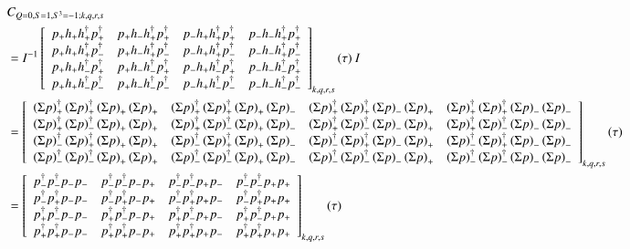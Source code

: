 \begin{equation*}
  \begin{aligned}
    &C_{Q=0,S=1,S^3=-1;k,q,r,s} \\
    &= I^{-1} \left[ 
    {\begin{array}{cccc}
      \cor{+}{+}{+}{+} & \cor{+}{+}{+}{-} & \cor{+}{+}{-}{+} & \cor{+}{+}{-}{-} \\
      \cor{+}{-}{+}{+} & \cor{+}{-}{+}{-} & \cor{+}{-}{-}{+} & \cor{+}{-}{-}{-} \\
      \cor{-}{+}{+}{+} & \cor{-}{+}{+}{-} & \cor{-}{+}{-}{+} & \cor{-}{+}{-}{-} \\
      \cor{-}{-}{+}{+} & \cor{-}{-}{+}{-} & \cor{-}{-}{-}{+} & \cor{-}{-}{-}{-} \\
    \end{array} } \right]_{k,q,r,s} (\tau)\:I \\
    &= \left[
    {\begin{array}{cccc}
      \dscor{+}{+}{+}{+} & \dscor{+}{+}{+}{-} & \dscor{+}{+}{-}{+} & \dscor{+}{+}{-}{-} \\
      \dscor{+}{-}{+}{+} & \dscor{+}{-}{+}{-} & \dscor{+}{-}{-}{+} & \dscor{+}{-}{-}{-} \\
      \dscor{-}{+}{+}{+} & \dscor{-}{+}{+}{-} & \dscor{-}{+}{-}{+} & \dscor{-}{+}{-}{-} \\
      \dscor{-}{-}{+}{+} & \dscor{-}{-}{+}{-} & \dscor{-}{-}{-}{+} & \dscor{-}{-}{-}{-} \\
    \end{array} }
    \right]_{k,q,r,s} (\tau) \\
    &= \left[ 
    {\begin{array}{cccc}
      \dcor{-}{-}{-}{-} & \dcor{-}{-}{-}{+} & \dcor{-}{-}{+}{-} & \dcor{-}{-}{+}{+} \\
      \dcor{-}{+}{-}{-} & \dcor{-}{+}{-}{+} & \dcor{-}{+}{+}{-} & \dcor{-}{+}{+}{+} \\
      \dcor{+}{-}{-}{-} & \dcor{+}{-}{-}{+} & \dcor{+}{-}{+}{-} & \dcor{+}{-}{+}{+} \\
      \dcor{+}{+}{-}{-} & \dcor{+}{+}{-}{+} & \dcor{+}{+}{+}{-} & \dcor{+}{+}{+}{+} \\
    \end{array} } 
    \right]_{k,q,r,s} (\tau) \\
  \end{aligned}
\end{equation*}

\renewcommand{\cor}[4]{p_{#3}h_{#4}h^\dagger_{#1}p^\dagger_{#2}}

